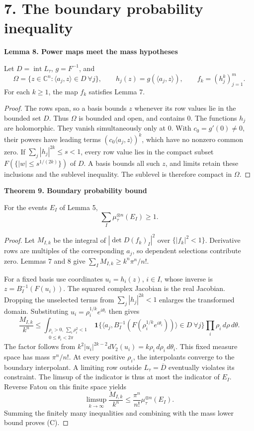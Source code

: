 \documentclass[11pt,a4paper]{article}
\newenvironment{statement}[1]{\begin{tcolorbox}[proofbox]\textbf{#1}\par\smallskip}{\end{tcolorbox}}
\newcommand{\C}{\mathbb C}
\newcommand{\intr}{\operatorname{int}}
\newcommand{\pair}[2]{\langle #1,#2\rangle}
\newcommand{\sect}[1]{\section*{#1}}
\begin{document}
\newpage
\sect{7. The boundary probability inequality}
\begin{statement}{Lemma 8. Power maps meet the mass hypotheses}
Let $D=\intr L_\tau$, $g=F^{-1}$, and
\[
 \Omega=\{z\in\C^n:\pair{a_j}z\in D\ \forall j\},\qquad
 h_j(z)=g(\pair{a_j}z),\qquad f_k=(h_j^k)_{j=1}^m.
\]
For each $k\geq1$, the map $f_k$ satisfies Lemma 7.
\end{statement}
\begin{proof}
The rows span, so a basis bounds $z$ whenever its row values lie in the
bounded set $D$. Thus $\Omega$ is bounded and open, and contains $0$.
The functions $h_j$ are holomorphic. They vanish simultaneously only at
$0$. With $c_0=g'(0)\ne0$, their powers have leading terms
$(c_0\pair{a_j}z)^k$, which have no nonzero common zero. If
$\sum_j|h_j|^{2k}\leq s<1$, every row value lies in the compact subset
$F(\{|w|\leq s^{1/(2k)}\})$ of $D$. A basis bounds all such $z$,
and limits retain these inclusions and the sublevel inequality. The
sublevel is therefore compact in $\Omega$.
\end{proof}

\begin{statement}{Theorem 9. Boundary probability bound}
For the events $E_I$ of Lemma 5,
\begin{equation}\tag{C}\label{cover}
 \sum_I\mu_\tau^{\otimes n}(E_I)\geq1.
\end{equation}
\end{statement}
\begin{proof}
Let $M_{I,k}$ be the integral of $|\det D(f_k)_I|^2$ over
$\{|f_k|^2<1\}$. Derivative rows are multiples of the corresponding
$a_j$, so dependent selections contribute zero. Lemmas 7 and 8 give
$\sum_I M_{I,k}\geq k^n\pi^n/n!$.

For a fixed basis use coordinates $u_i=h_{i}(z)$, $i\in I$, whose inverse
is $z=B_I^{-1}(F(u_i))$. The squared complex Jacobian is the real
Jacobian. Dropping the unselected terms from $\sum_j|h_j|^{2k}<1$
enlarges the transformed domain. Substituting
$u_i=\rho_i^{1/k}e^{i\theta_i}$ then gives
\[
 \frac{M_{I,k}}{k^n}\leq
 \int_{\substack{\rho_i>0,\ \sum_i\rho_i^2<1\\0\leq\theta_i<2\pi}}
 \mathbf1\{\pair{a_j}{B_I^{-1}(F(\rho_i^{1/k}e^{i\theta_i}))}\in D\ \forall j\}
 \prod_i\rho_i\,d\rho\,d\theta.
\]
The factor follows from
$k^2|u_i|^{2k-2}dV_2(u_i)=k\rho_i\,d\rho_i\,d\theta_i$.
This fixed measure space has mass $\pi^n/n!$. At every positive $\rho_i$,
the interpolants converge to the boundary interpolant. A limiting row
outside $L_\tau=\overline D$ eventually violates its constraint. The
limsup of the indicator is thus at most the indicator of $E_I$.
Reverse Fatou on this finite space yields
\[
 \limsup_{k\to\infty}\frac{M_{I,k}}{k^n}
 \leq\frac{\pi^n}{n!}\mu_\tau^{\otimes n}(E_I).
\]
Summing the finitely many inequalities and combining with the mass
lower bound proves (C).
\end{proof}
\end{document}
